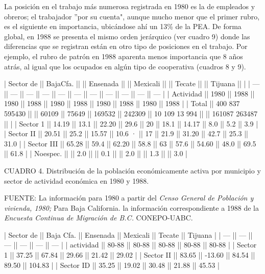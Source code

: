 \documentclass{article}
\begin{document}
La posición en el trabajo más numerosa registrada en 1980 es la de empleados y obreros; el trabajador ''por su cuenta", aunque mucho menor que el primer rubro, es el siguiente en importancia, ubicándose ahí un 13\% de la PEA. De forma global, en 1988 se presenta el mismo orden jerárquico (ver cuadro 9) donde las diferencias que se registran están en otro tipo de posiciones en el trabajo. Por ejemplo, el rubro de patrón en 1988 aparenta menos importancia que 8 años atrás, al igual que los ocupados en algún tipo de cooperativa (cuadros 8 y 9).

| Sector de  || BajaCfa.       ||      || Ensenada ||        || Mexicali ||        || Tecate        ||      || Tijuana       ||      |
| ---        || ---            || ---  || ---      || ---    || ---      || ---    || ---           || ---  || ---           || ---  |
| Actividad  || 1980           || 1988 || 1980     || 1988   || 1980     || 1988   || 1980          || 1988 || 1980          || 1988 |
| Total      || 400 837 595430 ||      || 60109    || 75649  || 169532   || 242309 || 10 109 13 994 ||      || 161087 263487 ||      |
| Sector 1   || 14.19          || 13.1 || 22.20    || 29.6   || 20       || 18.1   || 14.17         || 8.0  || 5.2           || 3.9  |
| Sector II  || 20.51          || 25.2 || 15.57    || 10.6 · || 17       || 21.9   || 31.20         || 42.7 || 25.3          || 31.0 |
| Sector III || 65.28          || 59.4 || 62.20    || 58.8   || 63       || 57.6   || 54.60         || 48.0 || 69.5          || 61.8 |
| Noespec.   ||                || 2.0  ||          || 0.1    ||          || 2.0    ||               || 1.3  ||               || 3.0  |

CUADRO 4. Distribución de la población económicamente activa por municipio y sector de actividad económica en 1980 y 1988.

FUENTE: La información para 1980 a partir del \textit{Censo General de Población y vivienda, 1980;} Para Baja California. la información correspondiente a 1988 de la \textit{Encuesta Continua de Migración de B.C.} CONEPO-UABC.

| Sector de || Baja Cfa. || Ensenada || Mexicali || Tecate || Tijuana |
| ---       || ---       || ---      || ---      || ---    || ---     |
| actividad || 80-88     || 80-88    || 80-88    || 80-88  || 80-88   |
| Sector 1  || 37.25     || 67.84    || 29.66    || 21.42  || 29.02   |
| Sector II || 83.65     || -13.60   || 84.54    || 89.50  || 104.83  |
| Sector ID || 35.25     || 19.02    || 30.48    || 21.88  || 45.53   |
\end{document}
